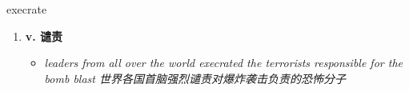 
\begin{frame}
{\huge execrate}
\begin{center}
\begin{enumerate}\Large
  \item \textbf{v. 谴责}
  \begin{itemize}
    \item \em{\Large{leaders from all over the world execrated the terrorists responsible for the bomb blast 世界各国首脑强烈谴责对爆炸袭击负责的恐怖分子}}
  \end{itemize}
\end{enumerate}
\end{center}
\end{frame}
